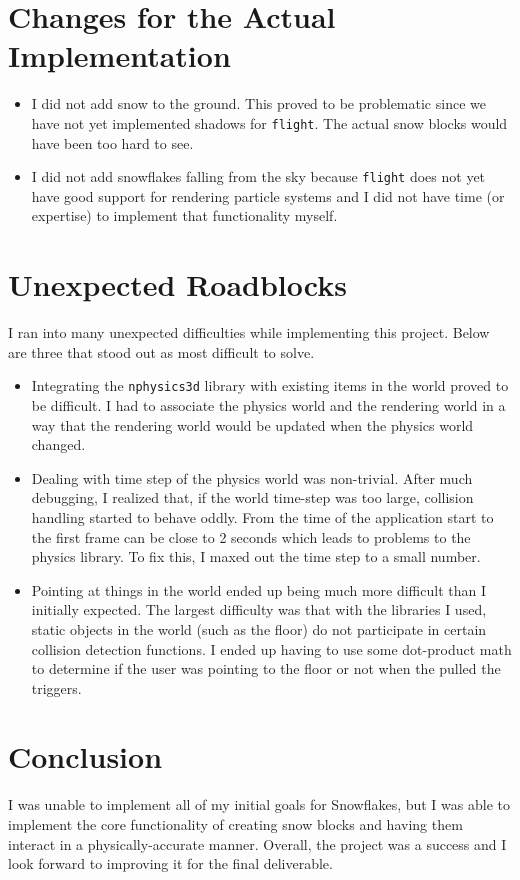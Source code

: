 \documentclass[11pt]{article}
\begin{document}
\section{Changes for the Actual Implementation}
\begin{itemize}
    \item I did not add snow to the ground. This proved to be problematic since
        we have not yet implemented shadows for \texttt{flight}. The actual snow
        blocks would have been too hard to see.

    \item I did not add snowflakes falling from the sky because \texttt{flight}
        does not yet have good support for rendering particle systems and I did
        not have time (or expertise) to implement that functionality myself.
\end{itemize}

\section{Unexpected Roadblocks}
I ran into many unexpected difficulties while implementing this project. Below
are three that stood out as most difficult to solve.
\begin{itemize}
    \item Integrating the \texttt{nphysics3d} library with existing items in the
        world proved to be difficult. I had to associate the physics world and
        the rendering world in a way that the rendering world would be updated
        when the physics world changed.

    \item Dealing with time step of the physics world was non-trivial. After
        much debugging, I realized that, if the world time-step was too large,
        collision handling started to behave oddly. From the time of the
        application start to the first frame can be close to 2 seconds which
        leads to problems to the physics library. To fix this, I maxed out the
        time step to a small number.

    \item Pointing at things in the world ended up being much more difficult
        than I initially expected. The largest difficulty was that with the
        libraries I used, static objects in the world (such as the floor) do not
        participate in certain collision detection functions. I ended up having
        to use some dot-product math to determine if the user was pointing to
        the floor or not when the pulled the triggers.
\end{itemize}

\section{Conclusion}
I was unable to implement all of my initial goals for Snowflakes, but I was able
to implement the core functionality of creating snow blocks and having them
interact in a physically-accurate manner. Overall, the project was a success and
I look forward to improving it for the final deliverable.
\end{document}
